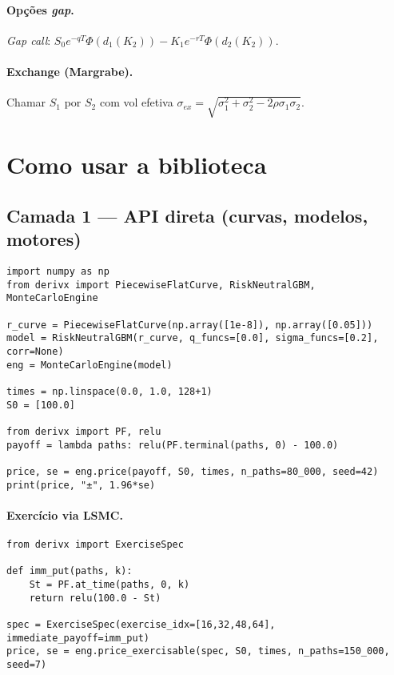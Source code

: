 ﻿\documentclass[11pt,a4paper]{article}
\begin{document}
\paragraph{Opções \emph{gap}.} \emph{Gap call}: $S_0 e^{-qT}\Phi(d_1(K_2)) - K_1 e^{-rT}\Phi(d_2(K_2))$.
\paragraph{Exchange (Margrabe).}
Chamar $S_1$ por $S_2$ com vol efetiva $\sigma_{ex}=\sqrt{\sigma_1^2+\sigma_2^2-2\rho\sigma_1\sigma_2}$.

\section{Como usar a biblioteca}

\subsection{Camada 1 — API direta (curvas, modelos, motores)}
\begin{lstlisting}[style=pystyle]
import numpy as np
from derivx import PiecewiseFlatCurve, RiskNeutralGBM, MonteCarloEngine

r_curve = PiecewiseFlatCurve(np.array([1e-8]), np.array([0.05]))
model = RiskNeutralGBM(r_curve, q_funcs=[0.0], sigma_funcs=[0.2], corr=None)
eng = MonteCarloEngine(model)

times = np.linspace(0.0, 1.0, 128+1)
S0 = [100.0]

from derivx import PF, relu
payoff = lambda paths: relu(PF.terminal(paths, 0) - 100.0)

price, se = eng.price(payoff, S0, times, n_paths=80_000, seed=42)
print(price, "±", 1.96*se)
\end{lstlisting}

\paragraph{Exercício via LSMC.}
\begin{lstlisting}[style=pystyle]
from derivx import ExerciseSpec

def imm_put(paths, k):
    St = PF.at_time(paths, 0, k)
    return relu(100.0 - St)

spec = ExerciseSpec(exercise_idx=[16,32,48,64], immediate_payoff=imm_put)
price, se = eng.price_exercisable(spec, S0, times, n_paths=150_000, seed=7)
\end{lstlisting}
\end{document}
